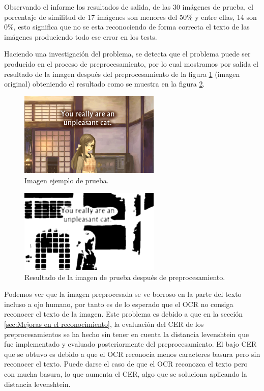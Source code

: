 Observando el informe los resultados de salida, de las 30 imágenes de prueba, el porcentaje de similitud de 17 imágenes son menores del 50\% y entre ellas, 14 son 0\%, esto significa que no se esta reconociendo de forma correcta el texto de las imágenes produciendo todo ese error en los tests.

Haciendo una investigación del problema, se detecta que el problema puede ser producido en el proceso de preprocesamiento, por lo cual mostramos por salida el resultado de la imagen después del preprocesamiento de la figura \ref{fig:Eva_2} (imagen original) obteniendo el resultado como se muestra en la figura \ref{fig:Eva_2P}.
\begin{figure}[H]
	\centering
	\includegraphics[width = 0.6\textwidth]{Imagenes/Evaluacion_OCR/2.png}
	\caption{Imagen ejemplo de prueba.}
	\label{fig:Eva_2}
\end{figure}
\begin{figure}[H]
	\centering
	\includegraphics[width = 0.6\textwidth]{Imagenes/Evaluacion_OCR/2_prepro.png}
	\caption{Resultado de la imagen de prueba después de preprocesamiento.}
	\label{fig:Eva_2P}
\end{figure}

Podemos ver que la imagen preprocesada se ve borroso en la parte del texto incluso a ojo humano, por tanto es de lo esperado que el OCR no consiga reconocer el texto de la imagen.
Este problema es debido a que en la sección \ref{sec:Mejoras en el reconocimiento}, la evaluación del CER de los preprocesamientos se ha hecho sin tener en cuenta la distancia levenshtein que fue implementado y evaluado posteriormente del preprocesamiento. El bajo CER que se obtuvo es debido a que el OCR reconocía menos caracteres basura pero sin reconocer el texto. Puede darse el caso de que el OCR reconozca el texto pero con mucha basura, lo que  aumenta el CER, algo que se soluciona aplicando la distancia levenshtein.


